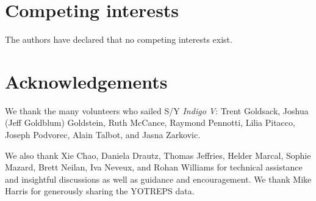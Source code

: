 \begin{refsection}
\section{Competing interests}

The authors have declared that no competing interests exist.

\section{Acknowledgements}

We thank the many volunteers who sailed S/Y {\em Indigo V}: Trent Goldsack, Joshua (Jeff Goldblum) Goldstein, Ruth McCance, Raymond Pennotti, Lilia Pitacco, Joseph Podvorec, Alain Talbot, and Jasna Zarkovic.

We also thank Xie Chao, Daniela Drautz, Thomas Jeffries, Helder Marcal, Sophie Mazard, Brett Neilan, Iva Neveux, and Rohan Williams for technical assistance and insightful discussions as well as guidance and encouragement. We thank Mike Harris for generously sharing the YOTREPS data.


\printbibliography[heading=subbibliography]

\end{refsection}
